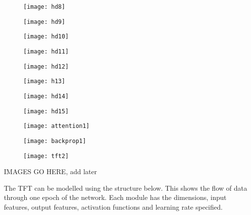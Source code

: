 \documentclass{article}
\begin{document}
\begin{figure}[ht]
    \centering
    \texttt{[image: hd8]}
    \caption{}
\end{figure}
\begin{figure}[ht]
    \centering
    \texttt{[image: hd9]}
    \caption{}
\end{figure}
\begin{figure}[ht]
    \centering
    \texttt{[image: hd10]}
    \caption{}
\end{figure}
\begin{figure}[ht]
    \centering
    \texttt{[image: hd11]}
    \caption{}
\end{figure}
\begin{figure}[ht]
    \centering
    \texttt{[image: hd12]}
    \caption{}
\end{figure}
\begin{figure}[ht]
    \centering
    \texttt{[image: h13]}
    \caption{}
\end{figure}
\begin{figure}[ht]
    \centering
    \texttt{[image: hd14]}
    \caption{}
\end{figure}
\begin{figure}[ht]
    \centering
    \texttt{[image: hd15]}
    \caption{}
\end{figure}
\begin{figure}[ht]
    \centering
    \texttt{[image: attention1]}
    \caption{}
\end{figure}
\begin{figure}[ht]
    \centering
    \texttt{[image: backprop1]}
    \caption{}
\end{figure}
\begin{figure}[ht]
    \centering
    \texttt{[image: tft2]}
    \caption{}
\end{figure}


\clearpage
IMAGES GO HERE, add later


The TFT can be modelled using the structure below. This shows the flow of data through one epoch of the network.  Each module has the dimensions, input features, output features, activation functions and learning rate specified.
\end{document}

